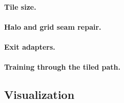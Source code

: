 \paragraph{Tile size.}

\paragraph{Halo and grid seam repair.}

\paragraph{Exit adapters.}

\paragraph{Training through the tiled path.}

\subsection{Visualization}
\label{sec:visualization}
